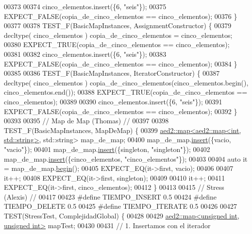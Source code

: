 \begin{DoxyCode}
00373 
00374     cinco\_elementos.insert(\{6, \textcolor{stringliteral}{"seis"}\});
00375     EXPECT\_FALSE(copia\_de\_cinco\_elementos == cinco\_elementos);
00376 \}
00377 
00378 TEST\_F(BasicMapInstances, AssignmentConstructor) \{
00379     decltype( cinco\_elementos ) copia\_de\_cinco\_elementos = cinco\_elementos;
00380     EXPECT\_TRUE(copia\_de\_cinco\_elementos == cinco\_elementos);
00381 
00382     cinco\_elementos.insert(\{6, \textcolor{stringliteral}{"seis"}\});
00383     EXPECT\_FALSE(copia\_de\_cinco\_elementos == cinco\_elementos);
00384 \}
00385 
00386 TEST\_F(BasicMapInstances, IteratorConstructor) \{
00387     decltype( cinco\_elementos ) copia\_de\_cinco\_elementos(cinco\_elementos.begin(), cinco\_elementos.end());
00388     EXPECT\_TRUE(copia\_de\_cinco\_elementos == cinco\_elementos);
00389 
00390     cinco\_elementos.insert(\{6, \textcolor{stringliteral}{"seis"}\});
00391     EXPECT\_FALSE(copia\_de\_cinco\_elementos == cinco\_elementos);
00392 \}
00393 
00395 \textcolor{comment}{// Map de Map (Thomas) //}
00397 \textcolor{comment}{}
00398 TEST\_F(BasicMapInstances, MapDeMap) \{
00399     \hyperlink{classaed2_1_1map}{aed2::map<aed2::map<int, std::string>}, std::string> map\_de\_map;
00400     map\_de\_map.\hyperlink{classaed2_1_1map_a60aacba06b1579630b3c8e996cf248c8_a60aacba06b1579630b3c8e996cf248c8}{insert}(\{vacio, \textcolor{stringliteral}{"vacio"}\});
00401     map\_de\_map.\hyperlink{classaed2_1_1map_a60aacba06b1579630b3c8e996cf248c8_a60aacba06b1579630b3c8e996cf248c8}{insert}(\{singleton, \textcolor{stringliteral}{"singleton"}\});
00402     map\_de\_map.\hyperlink{classaed2_1_1map_a60aacba06b1579630b3c8e996cf248c8_a60aacba06b1579630b3c8e996cf248c8}{insert}(\{cinco\_elementos, \textcolor{stringliteral}{"cinco\_elementos"}\});
00403 
00404     \textcolor{keyword}{auto} it = map\_de\_map.\hyperlink{classaed2_1_1map_a58a95705d54b3dda7f775ce5a22225cb_a58a95705d54b3dda7f775ce5a22225cb}{begin}();
00405     EXPECT\_EQ(it->first, vacio);
00406 
00407     it++;
00408     EXPECT\_EQ(it->first, singleton);
00409 
00410     it++;
00411     EXPECT\_EQ(it->first, cinco\_elementos);
00412 \}
00413 
00415 \textcolor{comment}{// Stress (Alexis) //}
00417 \textcolor{comment}{}
00423 \textcolor{preprocessor}{#define TIEMPO\_INSERT 0.5}
00424 \textcolor{preprocessor}{#define TIEMPO\_DELETE 0.5}
00425 \textcolor{preprocessor}{#define TIEMPO\_ITERATE 0.5}
00426 
00427 TEST(StressTest, ComplejidadGlobal) \{
00428 
00429     \hyperlink{classaed2_1_1map}{aed2::map<unsigned int, unsigned int>} mapTest;
00430 
00431     \textcolor{comment}{// 1. Insertamos con el iterador}

\end{DoxyCode}

